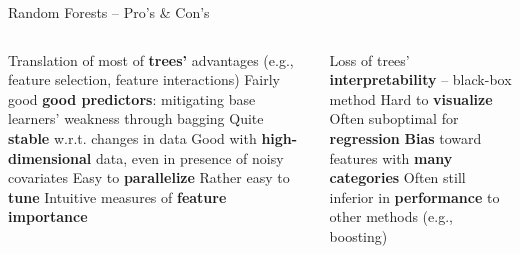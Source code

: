 \begin{frame}{Random Forests -- Pro's \& Con's}

\begin{columns}[onlytextwidth]
  \begin{column}{0.5\textwidth}
    \footnotesize
    \begin{itemize}
      \positem Translation of most of \textbf{trees'} advantages (e.g., 
      feature selection, feature interactions)
      \positem Fairly good \textbf{good predictors}: mitigating base learners' 
      weakness through bagging
      \positem Quite \textbf{stable} w.r.t. changes in data
      \positem Good with \textbf{high-dimensional} data, even in presence of 
      noisy covariates
      \positem Easy to \textbf{parallelize}
      \positem Rather easy to \textbf{tune}
      \positem Intuitive measures of \textbf{feature importance}
    \end{itemize}
  \end{column}
  \begin{column}{0.5\textwidth}
    \footnotesize
    \begin{itemize}
      \negitem Loss of trees' \textbf{interpretability} -- black-box 
      method
      \negitem Hard to \textbf{visualize}
      \negitem Often suboptimal for \textbf{regression}
      \negitem \textbf{Bias} toward features with \textbf{many categories}
      \negitem Often still inferior in \textbf{performance} to other methods 
      (e.g., boosting)
    \end{itemize}
  \end{column}
\end{columns}

\vfill

\small


\end{frame}


